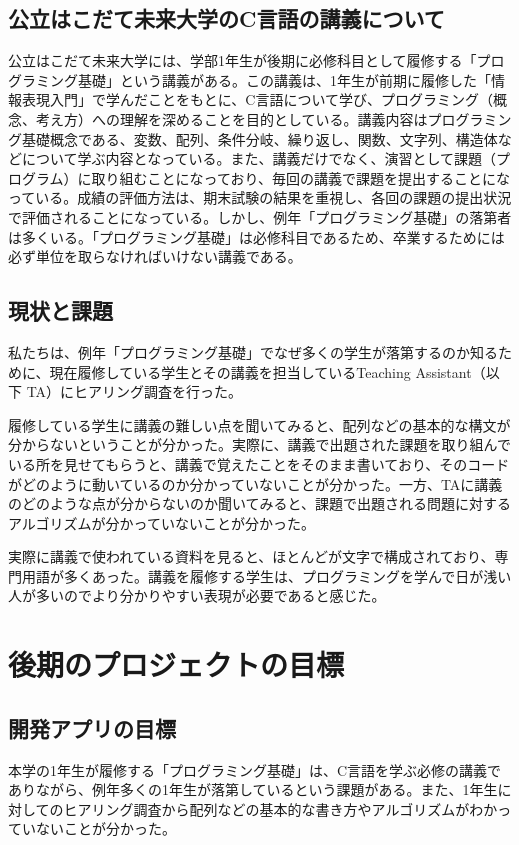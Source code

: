 \documentclass[openany,11pt,papersize]{jsbook}
\begin{document}
\section{公立はこだて未来大学のC言語の講義について}
\par 公立はこだて未来大学には、学部1年生が後期に必修科目として履修する「プログラミング基礎」という講義がある。この講義は、1年生が前期に履修した「情報表現入門」で学んだことをもとに、C言語について学び、プログラミング（概念、考え方）への理解を深めることを目的としている。講義内容はプログラミング基礎概念である、変数、配列、条件分岐、繰り返し、関数、文字列、構造体などについて学ぶ内容となっている。また、講義だけでなく、演習として課題（プログラム）に取り組むことになっており、毎回の講義で課題を提出することになっている。成績の評価方法は、期末試験の結果を重視し、各回の課題の提出状況で評価されることになっている。しかし、例年「プログラミング基礎」の落第者は多くいる。「プログラミング基礎」は必修科目であるため、卒業するためには必ず単位を取らなければいけない講義である。

\section{現状と課題}
\par 私たちは、例年「プログラミング基礎」でなぜ多くの学生が落第するのか知るために、現在履修している学生とその講義を担当しているTeaching Assistant（以下 TA）にヒアリング調査を行った。
\par 履修している学生に講義の難しい点を聞いてみると、配列などの基本的な構文が分からないということが分かった。実際に、講義で出題された課題を取り組んでいる所を見せてもらうと、講義で覚えたことをそのまま書いており、そのコードがどのように動いているのか分かっていないことが分かった。一方、TAに講義のどのような点が分からないのか聞いてみると、課題で出題される問題に対するアルゴリズムが分かっていないことが分かった。
\par 実際に講義で使われている資料を見ると、ほとんどが文字で構成されており、専門用語が多くあった。講義を履修する学生は、プログラミングを学んで日が浅い人が多いのでより分かりやすい表現が必要であると感じた。



\chapter{後期のプロジェクトの目標}

\section{開発アプリの目標}
本学の1年生が履修する「プログラミング基礎」は、C言語を学ぶ必修の講義でありながら、例年多くの1年生が落第しているという課題がある。また、1年生に対してのヒアリング調査から配列などの基本的な書き方やアルゴリズムがわかっていないことが分かった。
\end{document}
